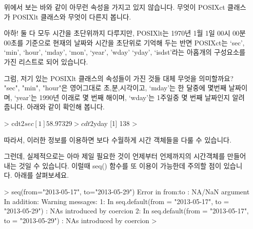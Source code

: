 위에서 보는 바와 같이 아무런 속성을 가지고 있지 않습니다. 
무엇이 POSIXct 클래스가 POSIXlt 클래스와 무엇이 다른지 봅니다. 

\begin{Schunk}
\end{Schunk}

아하! 둘 다 모두 시간을 초단위까지 다루지만, POSIXlt는 1970년 1월 1일 00시 00분 00초를 기준으로 현재의 날짜와 시간을 초단위로 기억해 두는 반면 POSIXct는 `sec', `min', `hour', `mday', `mon', `year', 'wday' `yday', `isdst'라는 아홉개의 구성요소를 가진 리스트로 되어 있습니다. 

그럼, 저기 있는 POSIXlt 클래스의 속성들이 가진 것들 대체 무엇을 의미할까요? 
"sec", "min", "hour"은 영어그대로 초,분,시각이고,  `mday'는 한 달중에 몇번째 날짜이며, `year'는 1990년 이래로 몇 번째 해이며, `wday'는 1주일중 몇 번째 날짜인지 알려줍니다. 
아래와 같이 확인해 봅니다. 

\begin{Schunk}
\begin{Soutput} 
> cdt2$sec
[1] 58.97329
> cdt2$yday
[1] 138
> 
\end{Soutput}
\end{Schunk}

따라서, 이러한 정보를 이용하면 보다 수월하게 시간 객체들을 다룰 수 있습니다. 



그런데, 실제적으로는 아마 제일 필요한 것이 언제부터 언제까지의 시간객체를 만들어 내는 것일 수 있습니다. 
이럴때 seq() 함수를 또 이용이 가능한데 주의할 점이 있습니다.
아래를 살펴보세요.


\begin{Schunk}
\begin{Soutput} 
> seq(from="2013-05-17", to="2013-05-29")
Error in from:to : NA/NaN argument
In addition: Warning messages:
1: In seq.default(from = "2013-05-17", to = "2013-05-29") :
  NAs introduced by coercion
2: In seq.default(from = "2013-05-17", to = "2013-05-29") :
  NAs introduced by coercion
>
\end{Soutput}
\end{Schunk}

